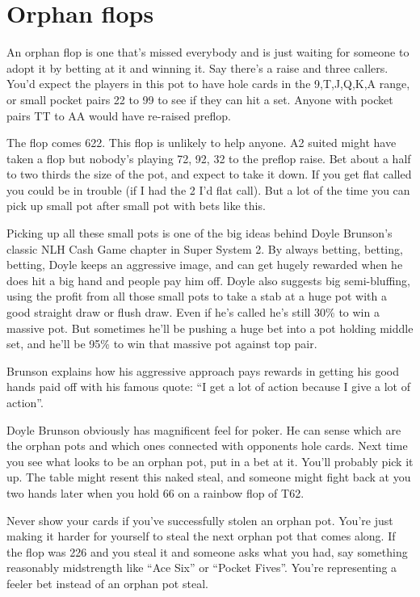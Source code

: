 \section{Orphan flops}

An orphan flop is one that's missed everybody and is just waiting
for someone to adopt it by betting at it and winning it. Say there's a raise
and three callers. You'd expect the players in this pot to
have hole cards in the 9,T,J,Q,K,A range, or small
pocket pairs 22 to 99 to see if they
can hit a set. Anyone with pocket pairs TT to AA would have
re-raised preflop.

The flop comes 622. This flop is unlikely to help anyone.
A2 suited might have taken a flop but nobody's playing 72, 92, 32 to the
preflop raise. Bet about a half to two thirds the size of the pot,
and expect to take it down. If you get flat called you could
be in trouble (if I had the 2 I'd flat call).
But a lot of the time you can pick up small pot after small pot
with bets like this.

Picking up all these small pots is one of the big ideas behind
Doyle Brunson's classic NLH Cash Game chapter in Super System 2.
By always betting, betting, betting, Doyle keeps an aggressive image,
and can get hugely rewarded when he does hit a big hand and people
pay him off. Doyle also suggests big semi-bluffing, using the
profit from all those small pots to take a stab at a huge pot
with a good straight draw or flush draw. Even if he's called
he's still 30\% to win a massive pot. But sometimes he'll be
pushing a huge bet into a pot holding middle set, and he'll be
95\% to win that massive pot against top pair.

Brunson explains how his aggressive approach pays rewards
in getting his good hands paid off with his famous quote:
``I get a lot of action because I give a lot of action''.

Doyle Brunson obviously has magnificent feel for poker. He can
sense which are the orphan pots and which ones connected with opponents hole cards.
Next time you see what looks to be an orphan pot, put in a bet at it.
You'll probably pick it up. The table might resent this
naked steal, and someone might fight back at you two hands
later when you hold 66 on a rainbow flop of T62.

Never show your cards if you've successfully stolen an orphan pot.
You're just making it harder for yourself to steal the next
orphan pot that comes along. If the flop was 226 and you steal it
and someone asks what you had, say something reasonably midstrength
like ``Ace Six'' or ``Pocket Fives''. You're representing a feeler bet
instead of an orphan pot steal.

